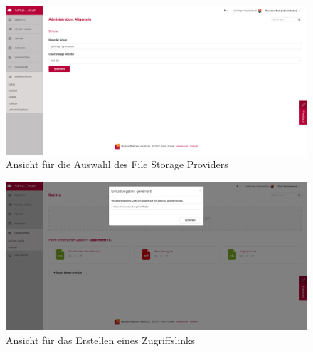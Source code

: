 \begin{figure}[H]
	\centering
	\includegraphics[width=1\linewidth]{images/adminFileStorage}
	\caption{Ansicht für die Auswahl des File Storage Providers}
	\label{fig:adminFileStorage}
\end{figure}

\begin{figure}[H]
	\centering
	\includegraphics[width=1\linewidth]{images/sharingfileui}
	\caption{Ansicht für das Erstellen eines Zugriffslinks}
	\label{fig:sharingfileui}
\end{figure}
\clearpage